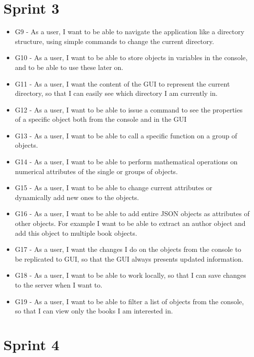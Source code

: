 \section{Sprint 3}
\label{sprint3pb}

\begin{itemize}
\item G9 - As a user, I want to be able to navigate the application like a directory structure, using simple commands to change the current directory.
\item G10 - As a user, I want to be able to store objects in variables in the console, and to be able to use these later on.
\item G11 - As a user, I want the content of the GUI to represent the current directory, so that I can easily see which directory I am currently in.
\item G12 - As a user, I want to be able to issue a command to see the properties of a specific object both from the console and in the GUI
\item G13 - As a user, I want to be able to call a specific function on a group of objects.
\item G14 - As a user, I want to be able to perform mathematical operations on numerical attributes of the single or groups of objects.
\item G15 - As a user, I want to be able to change current attributes or dynamically add new ones to the objects.
\item G16 - As a user, I want to be able to add entire JSON objects as attributes of other objects. For example I want to be able to extract an author object and add this object to multiple book objects.
\item G17 - As a user, I want the changes I do on the objects from the console to be replicated to GUI, so that the GUI always presents updated information.
\item G18 - As a user, I want to be able to work locally, so that I can save changes to the server when I want to.
\item G19 - As a user, I want to be able to filter a list of objects from the console, so that I can view only the books I am interested in.
\end{itemize}

\section{Sprint 4}
\label{sprint4pb}

